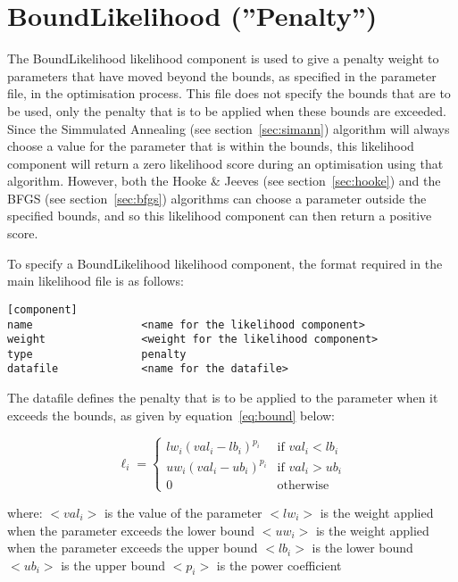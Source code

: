 \documentclass [a4paper, 10pt]{book}
\begin{document}
\section{BoundLikelihood (''Penalty'')}\label{sec:boundlike}
The BoundLikelihood likelihood component is used to give a penalty weight to parameters that have moved beyond the bounds, as specified in the parameter file, in the optimisation process.  This file does not specify the bounds that are to be used, only the penalty that is to be applied when these bounds are exceeded.  Since the Simmulated Annealing (see section~\ref{sec:simann}) algorithm will always choose a value for the parameter that is within the bounds, this likelihood component will return a zero likelihood score during an optimisation using that algorithm.  However, both the Hooke \& Jeeves (see section~\ref{sec:hooke}) and the BFGS (see section~\ref{sec:bfgs}) algorithms can choose a parameter outside the specified bounds, and so this likelihood component can then return a positive score.

\bigskip
To specify a BoundLikelihood likelihood component, the format required in the main likelihood file is as follows:

{\small\begin{verbatim}
[component]
name                 <name for the likelihood component>
weight               <weight for the likelihood component>
type                 penalty
datafile             <name for the datafile>
\end{verbatim}}

The datafile defines the penalty that is to be applied to the parameter when it exceeds the bounds, as given by equation~\ref{eq:bound} below:

\begin{equation}\label{eq:bound}
\ell_{i} =
\begin{cases}
lw_{i} (val_{i} - lb_{i})^{p_{i}} & \textrm{if $val_{i} < lb_i$} \\
uw_{i} (val_{i} - ub_{i})^{p_{i}} & \textrm{if $val_{i} > ub_i$} \\
0 & \textrm{otherwise}
\end{cases}
\end{equation}

where:\newline
$<val_i>$ is the value of the parameter\newline
$<lw_i>$ is the weight applied when the parameter exceeds the lower bound\newline
$<uw_i>$ is the weight applied when the parameter exceeds the upper bound\newline
$<lb_i>$ is the lower bound\newline
$<ub_i>$ is the upper bound\newline
$<p_i>$ is the power coefficient\newline
\end{document}

